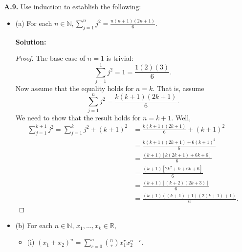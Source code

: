 \documentclass[12pt]{article}
\begin{document}
{\bf A.9.} Use induction to establish the following:
\begin{itemize}[label={},leftmargin=4mm, itemsep=1em, parsep=1em]
  \item (a) For each $n \in \mathbb{N}, \sum_{j=1}^{n}j^{2} =
    \frac{n(n+1)(2n+1)}{6}$.

  {\bf Solution:}
  \begin{proof}
    The base case of $n = 1$ is trivial:
    \[ \sum_{j=1}^{1}j^{2} = 1 = \frac{1(2)(3)}{6}. \]
    Now assume that the equality holds for $n = k$. That is, assume 
    \[ \sum_{j=1}^{n}j^{2} = \frac{k(k+1)(2k+1)}{6}. \]
    We need to show that the result holds for $n = k + 1$. Well, 
    \begin{align*}
      \sum_{j=1}^{k+1}j^{2} = \sum_{j=1}^{k}j^{2} + (k+1)^{2} & =
      \frac{k(k+1)(2k + 1)}{6} + (k+1)^{2} \\
      & = \frac{k(k+1)(2k+1) + 6(k+1)^{2}}{6} \\
      & = \frac{(k+1)[k(2k+1) + 6k + 6]}{6} \\
      & = \frac{(k+1)[2k^{2} + k + 6k + 6]}{6} \\
      & = \frac{(k+1)[(k+2)(2k+3)]}{6} \\
      & = \frac{(k+1)((k+1)+1)(2(k+1) + 1)}{6}.
    \end{align*}
  \end{proof}

  \item (b) For each $n\in \mathbb{N}$, $x_{1}, \dots, x_{k} \in \mathbb{R}$,
  \begin{itemize}[label={},leftmargin=4mm, itemsep=1em, parsep=1em]
    \item (i) $(x_{1} + x_{2})^{n} =
      \sum_{r=0}^{n}\binom{n}{r}x_{1}^{r}x_{2}^{n-r}$.


\end{itemize}
\end{itemize}
\end{document}
